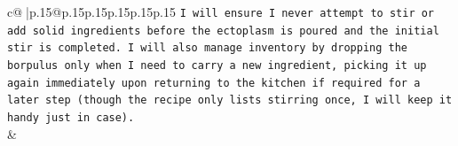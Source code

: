 \documentclass{article}
\begin{document}
{\begin{supertabular}{c@{$\;$}|p{.15\linewidth}@{}p{.15\linewidth}p{.15\linewidth}p{.15\linewidth}p{.15\linewidth}p{.15\linewidth}}
{{{\texttt{I will ensure I never attempt to stir or add solid ingredients before the ectoplasm is poured and the initial stir is completed. I will also manage inventory by dropping the borpulus only when I need to carry a new ingredient, picking it up again immediately upon returning to the kitchen if required for a later step (though the recipe only lists stirring once, I will keep it handy just in case).} \\
            }
        }
    }
    & \\ \\

\end{supertabular}
}
\end{document}
